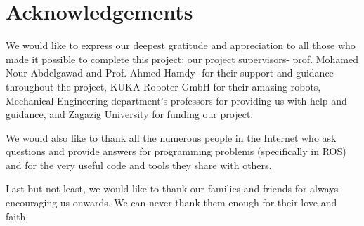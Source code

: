 
\chapter*{Acknowledgements}
%
%
%
%
%
%
%
%
%
%
%
We would like to express our deepest gratitude and appreciation to all those who made it possible to complete this project: our project supervisors- prof. Mohamed Nour Abdelgawad and Prof. Ahmed Hamdy- for their support and guidance throughout the project,  KUKA Roboter GmbH for their amazing robots, Mechanical Engineering department's professors for providing us with help and guidance, and Zagazig University for funding our project.

We would also like to thank all the numerous people in the Internet who ask questions and provide answers for programming problems (specifically in ROS) and for the very useful code and tools they share with others.

Last but not least, we would like to thank our families and friends for always encouraging us onwards. We can never thank them enough for their love and faith.